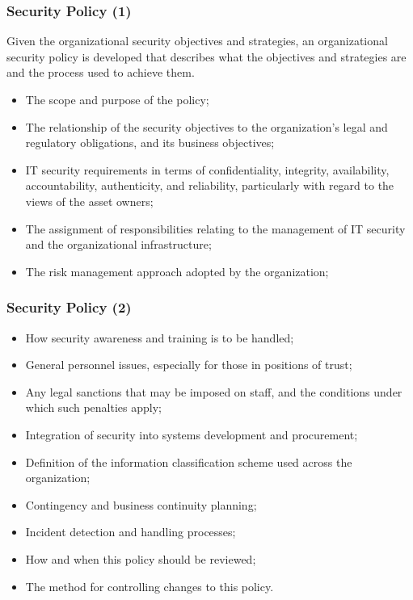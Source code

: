 \documentclass[xcolor ={table,usenames,dvipsnames}]{beamer}
\theoremstyle{definition}
\begin{document}
	\begin{frame}
		\frametitle{Security Policy (1)}
		Given the organizational security objectives and strategies, an organizational security policy is developed that describes what the objectives and strategies are and the process used to achieve them. 
		\begin{itemize}
			\item The scope and purpose of the policy;
			\item The relationship of the security objectives to the organization’s legal and regulatory obligations, and its business objectives;
			\item IT security requirements in terms of confidentiality, integrity, availability, accountability, authenticity, and reliability, particularly with regard to the views of the asset owners;
			\item The assignment of responsibilities relating to the management of IT security and the organizational infrastructure;
			\item The risk management approach adopted by the organization;
		\end{itemize}
	\end{frame}

	\begin{frame}
		\frametitle{Security Policy (2)}
		
		\begin{itemize}
		\item How security awareness and training is to be handled;
		\item General personnel issues, especially for those in positions of trust;
		\item Any legal sanctions that may be imposed on staff, and the conditions under which such penalties apply;
		\item Integration of security into systems development and procurement;
		\item Definition of the information classification scheme used across the organization;
		\item Contingency and business continuity planning;
		\item Incident detection and handling processes;
		\item How and when this policy should be reviewed;
		\item The method for controlling changes to this policy.
		\end{itemize}
	\end{frame}
\end{document}
